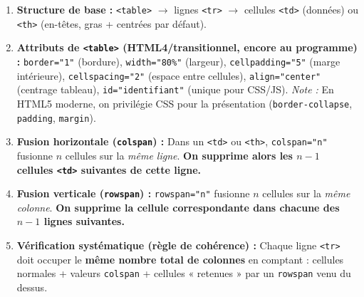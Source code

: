 \documentclass[11pt]{article}
\begin{document}
\begin{methode}
\begin{enumerate}
  \item \textbf{Structure de base :} \texttt{<table>} $\to$ lignes \texttt{<tr>} $\to$ cellules \texttt{<td>} (données) ou \texttt{<th>} (en-têtes, gras + centrées par défaut).
  \item \textbf{Attributs de \texttt{<table>} (HTML4/transitionnel, encore au programme) :}
        \texttt{border="1"} (bordure), \texttt{width="80\%"} (largeur), \texttt{cellpadding="5"} (marge intérieure), \texttt{cellspacing="2"} (espace entre cellules), \texttt{align="center"} (centrage tableau), \texttt{id="identifiant"} (unique pour CSS/JS).
        \emph{Note :} En HTML5 moderne, on privilégie CSS pour la présentation (\texttt{border-collapse}, \texttt{padding}, \texttt{margin}).
  \item \textbf{Fusion horizontale (\texttt{colspan}) :} Dans un \texttt{<td>} ou \texttt{<th>}, \texttt{colspan="n"} fusionne $n$ cellules sur la \emph{même ligne}. \textbf{On supprime alors les $n-1$ cellules \texttt{<td>} suivantes de cette ligne.}
  \item \textbf{Fusion verticale (\texttt{rowspan}) :} \texttt{rowspan="n"} fusionne $n$ cellules sur la \emph{même colonne}. \textbf{On supprime la cellule correspondante dans chacune des $n-1$ lignes suivantes.}
  \item \textbf{Vérification systématique (règle de cohérence) :} Chaque ligne \texttt{<tr>} doit occuper le \textbf{même nombre total de colonnes} en comptant : cellules normales + valeurs \texttt{colspan} + cellules « retenues » par un \texttt{rowspan} venu du dessus.
\end{enumerate}
\end{methode}
\end{document}

